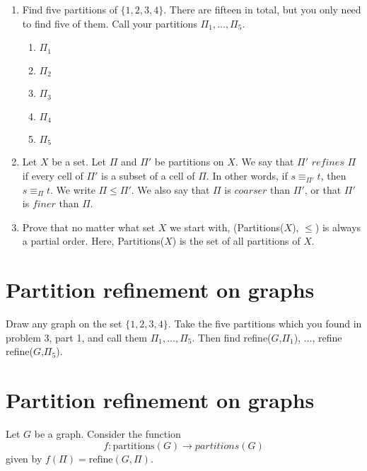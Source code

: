 \documentclass{article}
\begin{document}
\begin{enumerate}
    \item Find five partitions of $\{1,2,3,4\}$. There are fifteen in total, but you only need to find five of them. Call your partitions $\Pi_1 , \dots , \Pi_5$.
    
    \begin{enumerate}
        \item $\Pi_1$
        \item $\Pi_2$
        \item $\Pi_3$
        \item $\Pi_4$
        \item $\Pi_5$
    \end{enumerate}
    
    \item Let $X$ be a set. Let $\Pi$ and $\Pi '$ be partitions on $X$. We say that $\Pi ' \textit{ refines } \Pi$ if every cell of $\Pi '$ is a subset of a cell of $\Pi$. In other words, if $s \equiv_{\Pi '} t$, then  $s \equiv_{\Pi} t$. We write $\Pi \leq \Pi '$. We also say that $\Pi$ is $\textit{coarser}$ than $\Pi '$, or that $\Pi '$ is $\textit{finer}$ than $\Pi$. 
    
    
    \item Prove that no matter what set $X$ we start with, (Partitions($X$), $\leq$) is always a partial order. Here, Partitions($X$) is the set of all partitions of $X$.
    
    
    
\end{enumerate}

\vspace{1.5in}



\section{Partition refinement on graphs}
Draw any graph on the set $\{1,2,3,4\}$. Take the five partitions which you found in problem 3, part 1, and call them $\Pi_1 , \dots , \Pi_5$. Then find refine($G$,$\Pi_1$), $\dots$, refine refine($G$,$\Pi_5$).

\vspace{1.5in}


\section{Partition refinement on graphs}
Let $G$ be a graph. Consider the function $$f : \text{partitions}(G) \rightarrow partitions(G)$$ given by $f(\Pi) = \text{refine}(G,\Pi)$.
\end{document}
